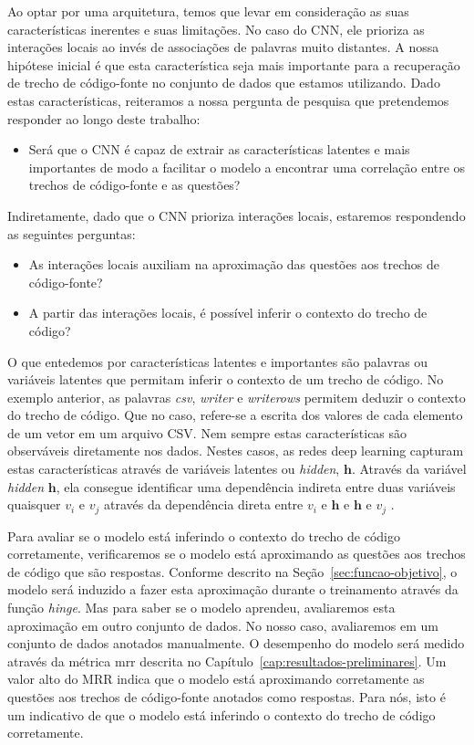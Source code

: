 Ao optar por uma arquitetura, temos que levar em consideração as suas características inerentes e suas limitações. No caso do CNN, ele prioriza as interações locais ao invés de associações de palavras muito distantes. A nossa hipótese inicial é que esta característica seja mais importante para a recuperação de trecho de código-fonte no conjunto de dados que estamos utilizando. Dado estas características, reiteramos a nossa pergunta de pesquisa que pretendemos responder ao longo deste trabalho:

\begin{itemize}
    \item Será que o CNN é capaz de extrair as características latentes e mais importantes de modo a facilitar o modelo a encontrar uma correlação entre os trechos de código-fonte e as questões?
\end{itemize}

Indiretamente, dado que o CNN prioriza interações locais, estaremos respondendo as seguintes perguntas:
\begin{itemize}
    
        \item As interações locais auxiliam na aproximação das questões aos trechos de código-fonte?
        \item A partir das interações locais, é possível inferir o contexto do trecho de código?
\end{itemize}



O que entedemos por características latentes e importantes são palavras ou variáveis latentes que permitam inferir o contexto de um trecho de código. No exemplo anterior, as palavras \emph{csv}, \emph{writer} e \emph{writerows} permitem deduzir o contexto do trecho de código. Que no caso, refere-se a escrita dos valores de cada elemento de um vetor em um arquivo CSV. Nem sempre estas características são observáveis diretamente nos dados. Nestes casos, as redes deep learning capturam estas características através de variáveis latentes ou \textit{hidden}, $\bm{h}$. Através da variável \textit{hidden} $\bm{h}$, ela consegue identificar uma dependência indireta entre duas variáveis quaisquer $v_{i}$ e $v_{j}$ através da dependência direta entre $v_{i}$ e $\bm{h}$ e $\bm{h}$ e $v_{j}$ \citep{Goodfellow-et-al-2016:structured-probabilistic-models-for-deep-learning}.

Para avaliar se o modelo está inferindo o contexto do trecho de código corretamente, verificaremos se o modelo está aproximando as questões aos trechos de código que são respostas. Conforme descrito na Seção~\ref{sec:funcao-objetivo}, o modelo será induzido a fazer esta aproximação durante o treinamento através da função \textit{hinge}. Mas para saber se o modelo aprendeu, avaliaremos esta aproximação em outro conjunto de dados. No nosso caso, avaliaremos em um conjunto de dados anotados manualmente. O desempenho do modelo será medido através da métrica \acrshort{mrr} descrita no Capítulo~\ref{cap:resultados-preliminares}. Um valor alto do MRR indica que o modelo está aproximando corretamente as questões aos trechos de código-fonte anotados como respostas. Para nós, isto é um indicativo de que o modelo está inferindo o contexto do trecho de código corretamente.
